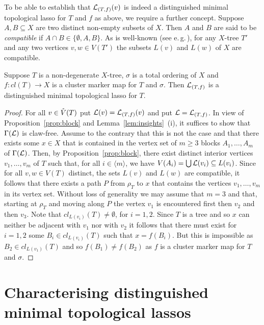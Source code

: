 To be able to establish that ${\mathcal L}_{(T,f)}(v)$ is indeed a distinguished
minimal topological lasso for $T$ and $f$ as above, we require a further
concept. Suppose $A, B\subseteq X$ are two distinct non-empty subsets of
$X$. Then $A$ and $B$ are said to be {\em compatible} if $A\cap
B\in\{\emptyset, A,B\}$. As is well-known (see
e.\,g.\,\cite{DHKMS11,semple2003phylogenetics}), for any $X$-tree $T'$ and any
two vertices $v,w\in V(T')$ the subsets $L(v)$ and $L(w)$ of $X$ are
compatible.

\begin{thm}
  \label{theo: distinguished-lasso-verification}
  Suppose $T$ is a non-degenerate $X$-tree, $\sigma$ is a total ordering of
  $X$ and $f:cl(T)\to X$ is a cluster marker map for $T$ and $\sigma$. Then
  ${\mathcal L}_{(T,f)}$ is a distinguished minimal topological lasso for $T$.
\end{thm}
\begin{proof}
  For all $v\in \mathring{V}(T)$ put ${\mathcal L}(v) = {\mathcal L}_{(T,f)}(v)$ and put
  ${\mathcal L}={\mathcal L}_{(T,f)}$.  In view of Proposition~\ref{prop:block} and
  Lemma~\ref{lem:insights}~(i), it suffices to show that $\Gamma({\mathcal L})$ is
  claw-free.  Assume to the contrary that this is not the case and that there
  exists some $x\in X$ that is contained in the vertex set of $m\geq 3$ blocks
  $A_1,\ldots,A_m$ of $\Gamma({\mathcal L})$. Then, by Proposition~\ref{prop:block},
  there exist distinct interior vertices $v_1, \ldots, v_m$ of $T$ such that,
  for all $i\in\langle m\rangle$, we have $V(A_i)=\bigcup{\mathcal L}(v_i)\subseteq
  L(v_i)$.  Since for all $v,w\in V(T)$ distinct, the sets $L(v)$ and $L(w)$
  are compatible, it follows that there exists a path $P$ from $\rho_T$ to $x$
  that contains the vertices $v_1,\ldots, v_m$ in its vertex set. Without loss
  of generality we may assume that $m=3$ and that, starting at $\rho_T$ and
  moving along $P$ the vertex $v_1$ is encountered first then $v_2$ and then
  $v_3$. Note that $cl_{L(v_i)}(T)\not=\emptyset$, for $i=1,2$.  Since $T$ is
  a tree and so $x$ can neither be adjacent with $v_1$ nor with $v_2$ it
  follows that there must exist for $i=1,2$ some $B_i\in cl_{L(v_i)}(T)$ such
  that $x=f(B_i)$. But this is impossible as $B_2\in cl_{L(v_1)}(T)$ and so
  $f(B_1)\not=f(B_2)$ as $f$ is a cluster marker map for $T$ and $\sigma$.
\end{proof}

\section{Characterising distinguished minimal topological lassos}
\label{sec:characterization-distinguished}

